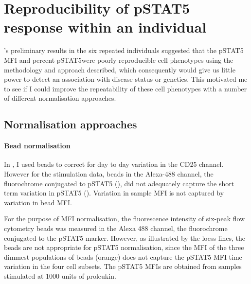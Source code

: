 \section{Reproducibility of pSTAT5 response within an individual}

's preliminary results in the six repeated individuals suggested that the pSTAT5 MFI and percent pSTAT5\positive were poorly reproducible
cell phenotypes using the methodology and approach described, which consequently would give us little power to detect an association with disease status or genetics.
This motivated me to see if I could improve the repeatability of these cell phenotypes with a number of different normalisation approaches.

\subsection{Normalisation approaches}

\paragraph{Bead normalisation} 
In , I used beads to correct for day to day variation in the CD25 channel.
However for the stimulation data, beads in the Alexa-488 channel, the fluorochrome conjugated to pSTAT5 (),
did not adequately capture the short term variation in pSTAT5 ().  
{Variation in sample MFI is not captured by variation in bead MFI.}
{
  For the purpose of MFI normalisation, the fluorescence intensity of six-peak flow cytometry beads
  was measured in the Alexa 488 channel, the fluorochrome conjugated to the pSTAT5 marker.
  However, as illustrated by the loess lines, the beads are not appropriate for pSTAT5 normalisation,
  since the MFI of the three dimmest populations of beads (orange)
  does not capture the pSTAT5 MFI time variation in the four cell subsets.
  The pSTAT5 MFIs are obtained from samples stimulated at 1000 units of proleukin.
  
}


